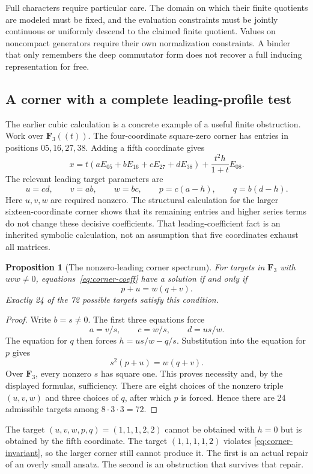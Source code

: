 \documentclass[11pt]{article}
\newtheorem{proposition}{Proposition}[section]
\theoremstyle{definition}\newtheorem{definition}[proposition]{Definition}
\newcommand{\F}{\mathbf F}
\begin{document}
Full characters require particular care. The domain on which their finite quotients are modeled must be fixed, and the evaluation constraints must be jointly continuous or uniformly descend to the claimed finite quotient. Values on noncompact generators require their own normalization constraints. A binder that only remembers the deep commutator form does not recover a full inducing representation for free.

\subsection{A corner with a complete leading-profile test}
The earlier cubic calculation is a concrete example of a useful finite obstruction. Work over $\F_3((t))$. The four-coordinate square-zero corner has entries in positions $05,16,27,38$. Adding a fifth coordinate gives
\[
 x=t(aE_{05}+bE_{16}+cE_{27}+dE_{38})
       +\frac{t^2h}{1+t}E_{08}.
 \tag{19.2}\label{eq:corner}
\]
The relevant leading target parameters are
\[
 u=cd,\qquad v=ab,\qquad w=bc,\qquad
 p=c(a-h),\qquad q=b(d-h).
 \tag{19.3}\label{eq:corner-coeff}
\]
Here $u,v,w$ are required nonzero. The structural calculation for the larger sixteen-coordinate corner shows that its remaining entries and higher series terms do not change these decisive coefficients. That leading-coefficient fact is an inherited symbolic calculation, not an assumption that five coordinates exhaust all matrices.

\begin{proposition}[The nonzero-leading corner spectrum]\label{prop:corner}
For targets in $\F_3$ with $uvw\neq0$, equations~\eqref{eq:corner-coeff} have a solution if and only if
\[
 p+u=w(q+v).
 \tag{19.4}\label{eq:corner-invariant}
\]
Exactly 24 of the 72 possible targets satisfy this condition.
\end{proposition}
\begin{proof}
Write $b=s\neq0$. The first three equations force
\[
 a=v/s,\qquad c=w/s,\qquad d=us/w.
\]
The equation for $q$ then forces $h=us/w-q/s$. Substitution into the equation for $p$ gives
\[
 s^2(p+u)=w(q+v).
\]
Over $\F_3$, every nonzero $s$ has square one. This proves necessity and, by the displayed formulas, sufficiency. There are eight choices of the nonzero triple $(u,v,w)$ and three choices of $q$, after which $p$ is forced. Hence there are 24 admissible targets among $8\cdot3\cdot3=72$.
\end{proof}

The target $(u,v,w,p,q)=(1,1,1,2,2)$ cannot be obtained with $h=0$ but is obtained by the fifth coordinate. The target $(1,1,1,1,2)$ violates \eqref{eq:corner-invariant}, so the larger corner still cannot produce it. The first is an actual repair of an overly small ansatz. The second is an obstruction that survives that repair.
\end{document}
